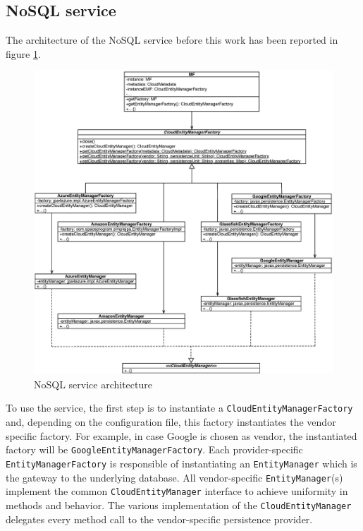 \subsection{NoSQL service}
The architecture of the NoSQL service before this work has been reported in figure \ref{fig:cpim-nosql}.

\begin{figure}[tbh]
  \centering
  \includegraphics[width=14cm]{images/cpim_nosql_old}
  \caption{NoSQL service architecture}
  \label{fig:cpim-nosql}
\end{figure}

\noindent To use the service, the first step is to instantiate a \texttt{CloudEntityManagerFactory} and, depending on the configuration file, this factory instantiates the vendor specific factory. For example, in case Google is chosen as vendor, the instantiated factory will be \texttt{GoogleEntityManagerFactory}. 
Each provider-specific \texttt{EntityManagerFactory} is responsible of instantiating an \texttt{EntityManager} which is the gateway to the underlying database. All vendor-specific \texttt{EntityManager}(s) implement the common \texttt{CloudEntityManager} interface to achieve uniformity in methods and behavior.
The various implementation of the \texttt{CloudEntityManager} delegates every method call to the vendor-specific persistence provider. 

